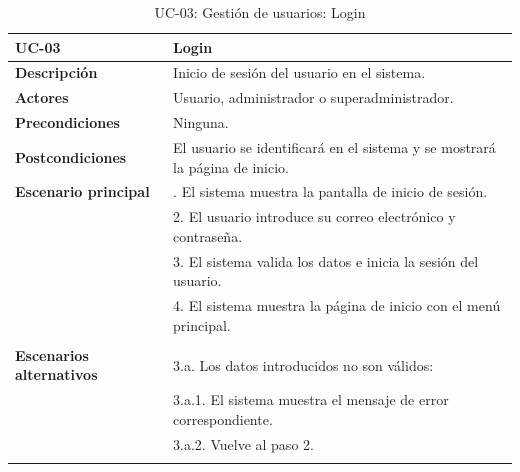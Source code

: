 \begin{table}[H]
  \begin{center}
    \begin{tabularx}{16.4cm}{|l|X|}
      \hline
      \textbf{UC-03} & \textbf{Login}\\
      \hline
      \textbf{Descripción} & Inicio de sesión del usuario en el sistema.\\
      \hline
      \textbf{Actores} & Usuario, administrador o superadministrador.\\
      \hline
      \textbf{Precondiciones} & Ninguna.\\
      \hline
      \textbf{Postcondiciones} & El usuario se identificará en el sistema y se mostrará la página de inicio.\\
      \hline
      \textbf{Escenario principal} & \smallskip 1. El sistema muestra la pantalla de inicio de sesión.\\
      & 2. El usuario introduce su correo electrónico y contraseña.\\
      & 3. El sistema valida los datos e inicia la sesión del usuario.\\
      & 4. El sistema muestra la página de inicio con el menú principal.\\
      & \\
      \hline
      \textbf{Escenarios alternativos} & \smallskip 3.a. Los datos introducidos no son válidos:\\
      & \hspace{0.3cm} 3.a.1. El sistema muestra el mensaje de error correspondiente.\\
      & \hspace{0.3cm} 3.a.2. Vuelve al paso 2.\\
      & \\
      \hline
    \end{tabularx}
    \caption{UC-03: Gestión de usuarios: Login}
    \label{tab:CU-login}
  \end{center}
\end{table}


